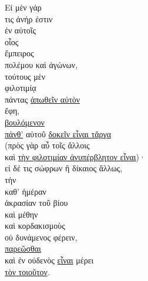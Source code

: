 
{\large
\begin{greek}
\noindent Εἰ μὲν γάρ \\
τις ἀνήρ ἐστιν \\
\tabto{2em} ἐν αὐτοῖς \\
οἷος \\
\tabto{2em} ἔμπειρος \\
\tabto{4em} πολέμου καὶ ἀγώνων, \\
τούτους μὲν \\
\tabto{2em} φιλοτιμίᾳ \\
πάντας \underline{ἀπωθεῖν αὐτὸν} \\
ἔφη, \\
\tabto{2em} \underline{βουλόμενον} \\
\tabto{4em} \underline{πάνθ'} αὑτοῦ \underline{δοκεῖν εἶναι τἄργα} \\
(πρὸς γὰρ αὖ τοῖς ἄλλοις \\
\tabto{2em} καὶ \underline{τὴν φιλοτιμίαν ἀνυπέρβλητον εἶναι})· \\
εἰ δέ τις σώφρων ἢ δίκαιος ἄλλως, \\
\tabto{2em} τὴν \\
\tabto{4em} καθ' ἡμέραν \\
\tabto{2em} ἀκρασίαν τοῦ βίου \\
\tabto{2em} καὶ μέθην \\
\tabto{2em} καὶ κορδακισμοὺς \\
οὐ δυνάμενος φέρειν, \\
\underline{παρεῶσθαι} \\
καὶ ἐν οὐδενὸς \underline{εἶναι} μέρει \\
\underline{τὸν τοιοῦτον}.\\

\end{greek}
}

